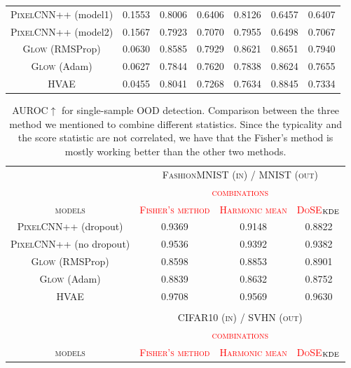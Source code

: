 {\begin{table}[tb]
{\begin{tabular}{ccccccc}
            \textsc{PixelCNN++} (model1)  & 0.1553 & 0.8006 & 0.6406 & 0.8126 & 0.6457 & 0.6407 \\
            \textsc{PixelCNN++} (model2) & 0.1567 & 0.7923 & 0.7070 & 0.7955 & 0.6498 &  0.7067\\
            \textsc{Glow} (RMSProp)  & 0.0630 & 0.8585 & 0.7929 & 0.8621 & 0.8651 &  0.7940\\
            \textsc{Glow} (Adam)   & 0.0627 & 0.7844 & 0.7620 &  0.7838 &  0.8624 &  0.7655 \\
            \textsc{HVAE}  & 0.0455 & 0.8041 &  0.7268 & 0.7634 & 0.8845 & 0.7334\\
            \bottomrule
        \end{tabular}
        \label{tab_modelagnostic:mmd}
    }
    \vspace*{-0.85\baselineskip}
\end{table}


\begin{table}[tb]
    \centering
    \caption{AUROC$\uparrow$ for single-sample OOD detection. Comparison between the three method we mentioned to combine different statistics. Since the typicality and the score statistic are not correlated, we have that the Fisher's method is mostly working better than the other two methods.}
        \scriptsize
        \begin{tabular}{cccc}
            \toprule
            &\multicolumn{3}{c}{\textsc{FashionMNIST (in) / MNIST (out)}}\\
            \cmidrule{2-4}
            & \multicolumn{3}{c}{\textcolor{red}{\textsc{combinations}}}\\
            \cmidrule{2-4}
            \textsc{models}  & \textcolor{red}{\textsc{Fisher's method}} & \textcolor{red}{\textsc{Harmonic mean}} &  \textcolor{red}{\textsc{DoSE$_{\textup{KDE}}$}}  \\
            \midrule
            \textsc{PixelCNN++} (dropout) & 0.9369 & 0.9148 & 0.8822 \\
            \textsc{PixelCNN++} (no dropout)  & 0.9536 & 0.9392 & 0.9382\\
            \textsc{Glow} (RMSProp) &  0.8598 & 0.8853 &  0.8901\\
            \textsc{Glow} (Adam)  & 0.8839 & 0.8632 & 0.8752\\
            \textsc{HVAE}  & 0.9708 &  0.9569 & 0.9630\\
            \bottomrule
            & & &  \\
            \toprule
            & \multicolumn{3}{c}{\textsc{CIFAR10 (in) / SVHN (out)}}\\
            \cmidrule{2-4}
            & \multicolumn{3}{c}{\textcolor{red}{\textsc{combinations}}}\\
            \cmidrule{2-4}
            \textsc{models}  & \textcolor{red}{\textsc{Fisher's method}} & \textcolor{red}{\textsc{Harmonic mean}} &  \textcolor{red}{\textsc{DoSE$_{\textup{KDE}}$}}  \\
            \midrule
        

\end{tabular}
\end{table}}

